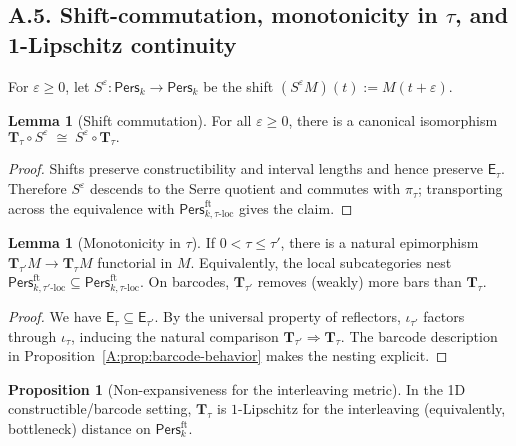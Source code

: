 \documentclass[11pt]{article}
\numberwithin{equation}{section}
\theoremstyle{plain}
\theoremstyle{definition}
\theoremstyle{remark}
\newcommand{\Pers}{\mathsf{Pers}}
\theoremstyle{plain}
\theoremstyle{definition}
\numberwithin{equation}{section}
\newtheorem{proposition}[theorem]{Proposition}
\newtheorem{lemma}[theorem]{Lemma}
\theoremstyle{definition}
\numberwithin{equation}{section}
\theoremstyle{plain}
\theoremstyle{definition}
\theoremstyle{remark}
\begin{document}
\subsection*{A.5. Shift-commutation, monotonicity in \texorpdfstring{$\tau$}{tau}, and 1-Lipschitz continuity}
For \(\varepsilon\ge 0\), let \(S^\varepsilon:\Pers_k\to\Pers_k\) be the shift \((S^\varepsilon M)(t):=M(t+\varepsilon)\).

\begin{lemma}[Shift commutation]\label{A:lem:shift}
For all \(\varepsilon\ge 0\), there is a canonical isomorphism
\(\mathbf{T}_\tau\circ S^\varepsilon \;\cong\; S^\varepsilon\circ \mathbf{T}_\tau.\)
\end{lemma}

\begin{proof}
Shifts preserve constructibility and interval lengths and hence preserve \(\mathsf{E}_\tau\).
Therefore \(S^\varepsilon\) descends to the Serre quotient and commutes with \(\pi_\tau\); transporting across the equivalence with \(\Pers^{\mathrm{ft}}_{k,\tau\text{-loc}}\) gives the claim.
\end{proof}

\begin{lemma}[Monotonicity in \(\tau\)]\label{A:lem:monotone-tau}
If \(0<\tau\le \tau'\), there is a natural epimorphism \(\mathbf{T}_{\tau'}M\to \mathbf{T}_{\tau}M\) functorial in \(M\).
Equivalently, the local subcategories nest \(\Pers^{\mathrm{ft}}_{k,\tau'\text{-loc}}\subseteq \Pers^{\mathrm{ft}}_{k,\tau\text{-loc}}\).
On barcodes, \(\mathbf{T}_{\tau'}\) removes (weakly) more bars than \(\mathbf{T}_{\tau}\).
\end{lemma}

\begin{proof}
We have \(\mathsf{E}_\tau\subseteq \mathsf{E}_{\tau'}\). By the universal property of reflectors, \(\iota_{\tau'}\) factors through \(\iota_{\tau}\), inducing the natural comparison \(\mathbf{T}_{\tau'}\Rightarrow \mathbf{T}_{\tau}\). The barcode description in Proposition~\ref{A:prop:barcode-behavior} makes the nesting explicit.
\end{proof}

\begin{proposition}[Non-expansiveness for the interleaving metric]\label{A:prop:lipschitz}
In the 1D constructible/barcode setting, \(\mathbf{T}_\tau\) is \(1\)-Lipschitz for the interleaving (equivalently, bottleneck) distance on \(\Pers^{\mathrm{ft}}_k\).
\end{proposition}
\end{document}
